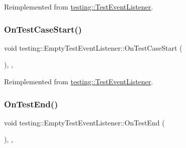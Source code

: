 Reimplemented from \hyperlink{classtesting_1_1TestEventListener_a6cada1572dde8010b94f6dd237ce52f4}{testing\+::\+Test\+Event\+Listener}.

\mbox{\label{classtesting_1_1EmptyTestEventListener_a7f9a84967fde01000b7a56e9e84b6052}} 
\subsubsection{\texorpdfstring{On\+Test\+Case\+Start()}{OnTestCaseStart()}}
{\footnotesize\ttfamily void testing\+::\+Empty\+Test\+Event\+Listener\+::\+On\+Test\+Case\+Start (\begin{DoxyParamCaption}\item[{const Test\+Case \&}]{ }\end{DoxyParamCaption})\hspace{0.3cm}{\ttfamily [inline]}, {\ttfamily [override]}, {\ttfamily [virtual]}}



Reimplemented from \hyperlink{classtesting_1_1TestEventListener_ac48628c9f78d3e10bff77c7366e9e780}{testing\+::\+Test\+Event\+Listener}.

\mbox{\label{classtesting_1_1EmptyTestEventListener_a709d7077c086c877d214231bc520ef90}} 
\subsubsection{\texorpdfstring{On\+Test\+End()}{OnTestEnd()}}
{\footnotesize\ttfamily void testing\+::\+Empty\+Test\+Event\+Listener\+::\+On\+Test\+End (\begin{DoxyParamCaption}\item[{const \hyperlink{classtesting_1_1TestInfo}{Test\+Info} \&}]{ }\end{DoxyParamCaption})\hspace{0.3cm}{\ttfamily [inline]}, {\ttfamily [override]}, {\ttfamily [virtual]}}



